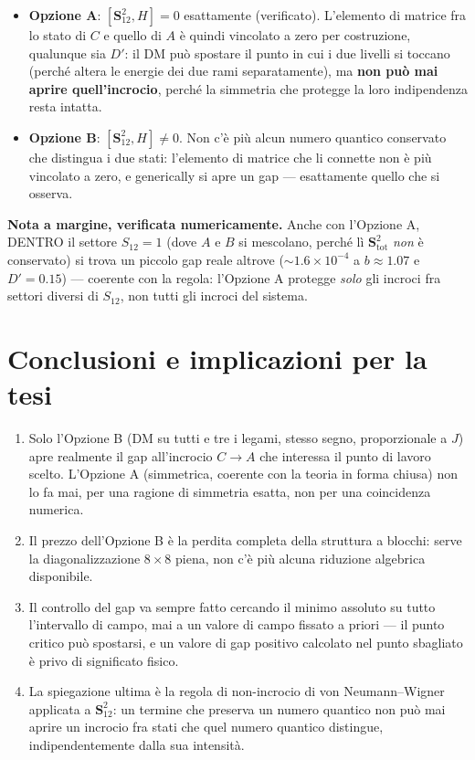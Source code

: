\documentclass[11pt,a4paper]{article}
\begin{document}
\begin{itemize}[leftmargin=1.4em]
\item \textbf{Opzione A}: $[\mathbf S_{12}^2, H]=0$ esattamente (verificato). L'elemento
di matrice fra lo stato di $C$ e quello di $A$ è quindi vincolato a zero per
costruzione, qualunque sia $D'$: il DM può spostare il punto in cui i due livelli si
toccano (perché altera le energie dei due rami separatamente), ma \textbf{non può mai
aprire quell'incrocio}, perché la simmetria che protegge la loro indipendenza resta
intatta.
\item \textbf{Opzione B}: $[\mathbf S_{12}^2,H]\neq0$. Non c'è più alcun numero
quantico conservato che distingua i due stati: l'elemento di matrice che li connette
non è più vincolato a zero, e generically si apre un gap — esattamente quello che si
osserva.
\end{itemize}

\textbf{Nota a margine, verificata numericamente.} Anche con l'Opzione A, DENTRO il
settore $S_{12}=1$ (dove $A$ e $B$ si mescolano, perché lì $\mathbf S^2_\text{tot}$
\emph{non} è conservato) si trova un piccolo gap reale altrove
($\sim1.6\times10^{-4}$ a $b\approx1.07$ e $D'=0.15$) — coerente con la regola:
l'Opzione A protegge \emph{solo} gli incroci fra settori diversi di $S_{12}$, non
tutti gli incroci del sistema.

\section{Conclusioni e implicazioni per la tesi}

\begin{enumerate}[leftmargin=1.4em]
\item Solo l'Opzione B (DM su tutti e tre i legami, stesso segno, proporzionale a $J$)
apre realmente il gap all'incrocio $C\to A$ che interessa il punto di lavoro scelto.
L'Opzione A (simmetrica, coerente con la teoria in forma chiusa) non lo fa mai, per
una ragione di simmetria esatta, non per una coincidenza numerica.
\item Il prezzo dell'Opzione B è la perdita completa della struttura a blocchi:
serve la diagonalizzazione $8\times8$ piena, non c'è più alcuna riduzione algebrica
disponibile.
\item Il controllo del gap va sempre fatto cercando il minimo assoluto su tutto
l'intervallo di campo, mai a un valore di campo fissato a priori — il punto critico
può spostarsi, e un valore di gap positivo calcolato nel punto sbagliato è privo di
significato fisico.
\item La spiegazione ultima è la regola di non-incrocio di von Neumann--Wigner
applicata a $\mathbf S_{12}^2$: un termine che preserva un numero quantico non può mai
aprire un incrocio fra stati che quel numero quantico distingue, indipendentemente
dalla sua intensità.
\end{enumerate}
\end{document}
